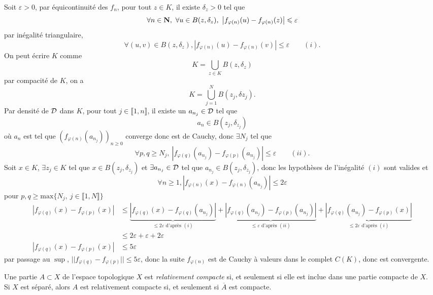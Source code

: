 \documentclass[a4paper,11pt, twoside]{article}
\begin{document}
\begin{Proof}
  Soit $\varepsilon>0$, par équicontinuité des $f_n$, pour tout $z\in K$, il existe $\delta_z>0$ tel que 
  $$\forall n\in \N,\ \forall u\in B(z,\delta_z),\ \left|f_{\varphi(n)}(u)-f_{\varphi(n)}(z)\right|\leqslant \varepsilon$$
  par inégalité triangulaire,
  $$\forall (u,v)\in B(z,\delta_z), \left|f_{\varphi(n)}(u)-f_{\varphi(n)}(v)\right|\leqslant \varepsilon\qquad (i).$$
  On peut écrire $K$ comme 
  $$K=\bigcup_{z\in K}B(z,\delta_z)$$
  par compacité de $K$, on a 
  $$K=\bigcup_{j=1}^NB(z_j,\delta{z_j}).$$
  Par densité de $\mathcal D$ dans $K$, pour tout $j\in\llbracket 1,n\rrbracket$, il existe un $a_{n_j}\in\mathcal D$ tel que 
  $$a_n\in B(z_j,\delta_{z_j})$$
  où $a_n$ est tel que $\left(f_{\varphi(n)}(a_{n_j})\right)_{n\geqslant 0}$ converge donc est de Cauchy, donc $\exists N_j$ tel que 
  $$\forall p,q\geqslant N_j,\ \left|f_{\varphi(q)}(a_{n_j})-f_{\varphi(p)}(a_{n_j})\right|\leqslant\varepsilon\qquad (ii).$$
  Soit $x\in K$, $\exists z_j\in K$ tel que $x\in B(z_j,\delta_{z_j})$ et $\exists a_{n_j}\in\mathcal D$ tel que $a_{n_j}\in B(z_j,\delta_{z_j})$, donc les hypothèses de l'inégalité $(i)$ sont valides et
  $$\forall n\geqslant 1, \left|f_{\varphi(n)}(x)-f_{\varphi(n)}(a_{n_j})\right|\leqslant 2\varepsilon$$
  pour $p,q\geqslant\mathrm{max}\{N_j,\ j\in\llbracket 1,N\rrbracket\}$
  \begin{align*}
    \left|f_{\varphi(q)}(x)-f_{\varphi(p)}(x)\right|&\leqslant \underbrace{\left|f_{\varphi(q)}(x)-f_{\varphi(q)}(a_{n_j})\right|}_{\leqslant 2\varepsilon\text{ d'après }(i)}+\underbrace{\left|f_{\varphi(q)}(a_{n_j})-f_{\varphi(p)}(a_{n_j})\right|}_{\leqslant \varepsilon\text{ d'après }(ii)}+\underbrace{\left|f_{\varphi(q)}(a_{n_j})-f_{\varphi(p)}(x)\right|}_{\leqslant 2\varepsilon\text{ d'après }(i)}\\
    &\leqslant 2\varepsilon+\varepsilon+2\varepsilon\\
    \left|f_{\varphi(q)}(x)-f_{\varphi(p)}(x)\right|&\leqslant 5\varepsilon
  \end{align*}
  par passage au $\mathrm{\sup}$, $||f_{\varphi(q)}-f_{\varphi(p)}||\leqslant 5\varepsilon$, donc la suite $f_{\varphi(n)}$ est de Cauchy à valeurs dans le complet $C(K)$, donc est convergente.
\end{Proof}

\begin{Def}
  Une partie $A\subset X$ de l'espace topologique $X$ est \emph{relativement compacte} si, et seulement si elle est inclue dans une partie compacte de $X$.\\

  Si $X$ est séparé, alors $A$ est relativement compacte si, et seulement si $\overline A$ est compacte.
\end{Def}
\end{document}
